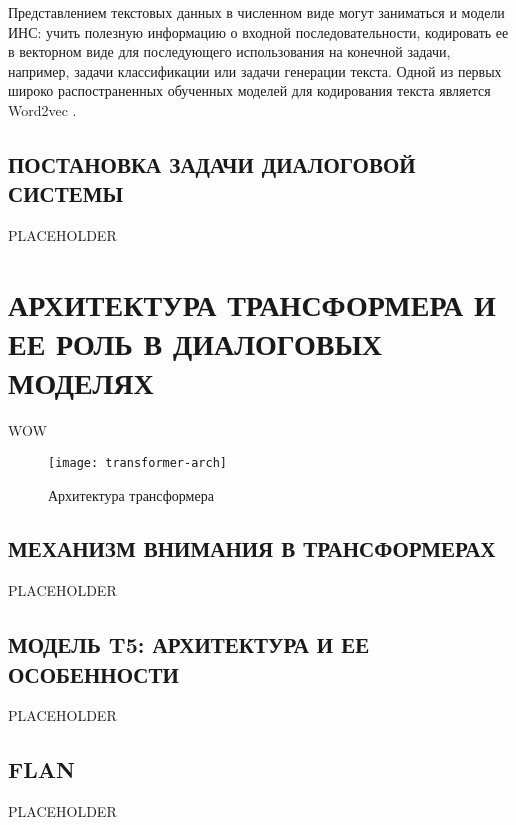 Представлением текстовых данных в численном виде могут заниматься и модели ИНС: учить полезную информацию о входной последовательности, кодировать ее в векторном виде для последующего использования на конечной задачи, например, задачи классификации или задачи генерации текста. Одной из первых широко распостраненных обученных моделей для кодирования текста является Word2vec \cite{word2vec-paper}.

\subsection{ПОСТАНОВКА ЗАДАЧИ ДИАЛОГОВОЙ СИСТЕМЫ}
PLACEHOLDER

\section{АРХИТЕКТУРА ТРАНСФОРМЕРА И ЕЕ РОЛЬ В ДИАЛОГОВЫХ МОДЕЛЯХ}
WOW

\begin{figure}[H]
    \centering
    \texttt{[image: transformer-arch]}
    \caption{Архитектура трансформера}
    \label{fig:transformer-arch}
\end{figure}


\subsection{МЕХАНИЗМ ВНИМАНИЯ В ТРАНСФОРМЕРАХ}
PLACEHOLDER

\subsection{МОДЕЛЬ T5: АРХИТЕКТУРА И ЕЕ ОСОБЕННОСТИ}
PLACEHOLDER

\subsection{FLAN}
PLACEHOLDER
